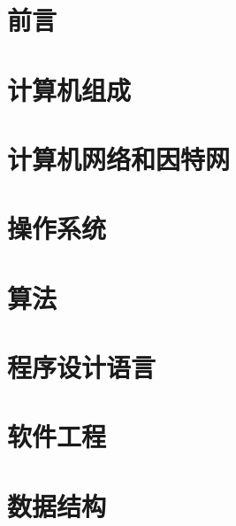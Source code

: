 \documentclass[a4pape]{book}
\begin{document}
\frontmatter
\tableofcontents

\mainmatter
\chapter{前言}

\chapter{计算机组成}

\chapter{计算机网络和因特网}

\chapter{操作系统}

\chapter{算法}

\chapter{程序设计语言}

\chapter{软件工程}

\chapter{数据结构}

\end{document}
